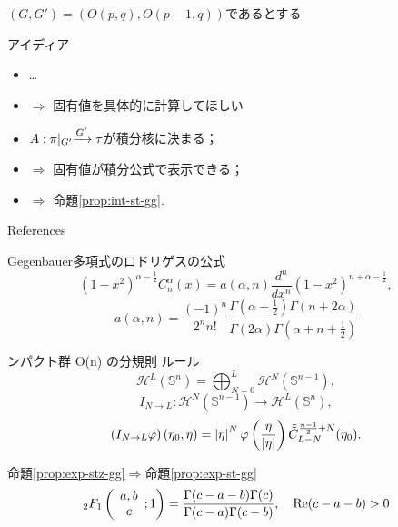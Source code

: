 \documentclass[pdf,notes]{beamer}
\renewcommand{\implies}{\Rightarrow}
\begin{document}
\begin{frame}{$(G,G')=\left( O(p,q),O(p-1,q) \right)$であるとする}
\begin{center}
	\begin{tikzpicture}[rotate=-90]
	
	\end{tikzpicture}
\end{center}
\end{frame}
\begin{frame}{アイディア}
	\begin{itemize}%
		\item \ldots
		\item $\implies$ 固有値を具体的に計算してほしい
		\item $\mysbo$が積分核に決まる；
		\item $\implies$ 固有値が積分公式で表示できる；
		\item $\implies$ 命題\kern-0.1cm\ref{prop:int-st-gg}.
	\end{itemize}
\end{frame}
\appendix
\begin{frame}[allowframebreaks]{References}
	
	\nocite{Selberg:411367}
	\nocite{warnaar2010sl3}
	\nocite{dotsenko1985four}
	\nocite{tarasov2003selberg}

\end{frame}
\addtocounter{framenumber}{-3}
\begin{frame}[noframenumbering]{Gegenbauer多項式のロドリゲスの公式}
			\begin{equation*}
				(1-x^2)^{\alpha-\frac{1}{2}}C_n^\alpha(x)=a(\alpha,n)
				\frac{d^n}{dx^n} (1-x^2)^{n+\alpha-\frac{1}{2}},
			\end{equation*}
			\begin{equation*}
				a(\alpha,n)=\frac{(-1)^n}{2^nn!}\frac{\Gamma\left( \alpha+\frac{1}{2} \right)\Gamma\left( n+2\alpha \right)}{\Gamma(2\alpha)\Gamma\left(\alpha+n+\frac{1}{2}  \right)}
			\end{equation*}
\end{frame}
\begin{frame}[noframenumbering]{ンパクト群 O(n) の分規則 ルール}
	\begin{equation*}
		\mathcal{H}^L(\mathbb{S}^n)=\bigoplus_{N=0}^L \mathcal{H}^N(\mathbb{S}^{n-1}),
	\end{equation*}
	\begin{equation*}
		I_{N\to L}:\mathcal{H}^N(\mathbb{S}^{n-1})\to \mathcal{H}^L(\mathbb{S}^n),
	\end{equation*}
	\begin{equation*}
		\left(I_{N\to L}\varphi  \right)(\eta_0,\eta)=\myabs{\eta}^N\varphi\left( \frac{\eta}{\myabs{\eta}} \right)\tilde{\tilde{C}}^{\frac{n-1}{2}+N}_{L-N}(\eta_0).
	\end{equation*}
\end{frame}
\begin{frame}[noframenumbering]{命題\ref{prop:exp-stz-gg}$\implies$命題\ref{prop:exp-st-gg}}
\begin{equation*}
		{}_2F_1\left( \begin{array}[]{c}
			a,b\\c
		\end{array};1\right)=\frac{\Gamma(c-a-b)\Gamma(c)}{\Gamma(c-a)\Gamma(c-b)},\quad \Re(c-a-b)>0
	\end{equation*}
\end{frame}
\end{document}
